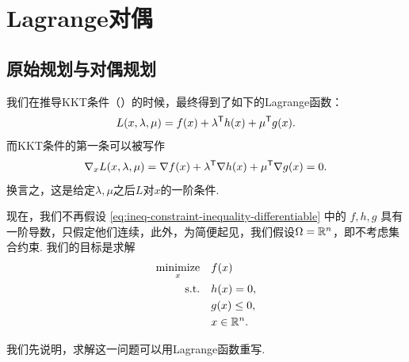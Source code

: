 \section{Lagrange对偶}

\subsection{原始规划与对偶规划}

我们在推导KKT条件（）的时候，最终得到了如下的Lagrange函数：
\[L(x,\lambda,\mu)=f(x)+\lambda^{\mathsf{T}} h(x)+\mu^{\mathsf{T}} g(x).\]
而KKT条件的第一条可以被写作
\[\nabla_x L(x,\lambda,\mu)=\nabla f(x)+\lambda^{\mathsf{T}} \nabla h(x)+\mu^{\mathsf{T}} \nabla g(x)=0.\]
换言之，这是给定$\lambda,\mu$之后$L$对$x$的一阶条件. 

现在，我们不再假设 \eqref{eq:ineq-constraint-inequality-differentiable} 中的 $f,h,g$ 具有一阶导数，只假定他们连续，此外，为简便起见，我们假设$\Omega=\mathbb{R}^n$，即不考虑集合约束. 我们的目标是求解
\begin{equation}
\begin{aligned}
    \operatorname*{minimize}_x\quad& f(x) \\
    \text{s.t.}\quad& h(x)=0,\\
    & g(x)\leq 0, \\
    & x \in \mathbb{R}^n.
\end{aligned}\label{eq:non-differentiable-constraint}
\end{equation}

我们先说明，求解这一问题可以用Lagrange函数重写. 

